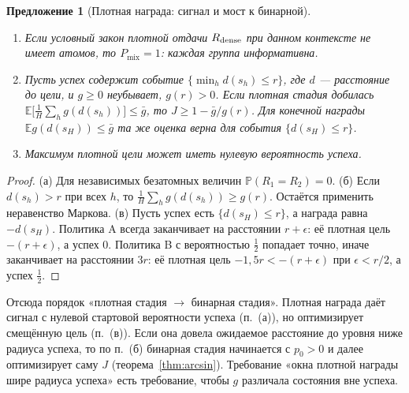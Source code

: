 \documentclass[11pt,a4paper]{article}
\theoremstyle{plain}
\newtheorem{proposition}[theorem]{Предложение}
\theoremstyle{definition}
\theoremstyle{remark}
\newcommand{\E}{\mathbb{E}}
\newcommand{\PP}{\mathbb{P}}
\newcommand{\Pmix}{P_{\mathrm{mix}}}
\begin{document}
\begin{proposition}[Плотная награда: сигнал и мост к бинарной]\label{prop:dense}
\begin{enumerate}[label=(\alph*)]
\item Если условный закон плотной отдачи $R_{\rm dense}$ при данном контексте не имеет атомов, то $\Pmix=1$: каждая группа информативна.
\item Пусть успех содержит событие $\{\min_hd(s_h)\le r\}$, где $d$ --- расстояние до цели, и $g\ge0$ неубывает, $g(r)>0$. Если плотная стадия добилась $\E\bigl[\tfrac1H\sum_hg(d(s_h))\bigr]\le\bar g$, то $J\ge1-\bar g/g(r)$. Для конечной награды $\E g(d(s_H))\le\bar g$ та же оценка верна для события $\{d(s_H)\le r\}$.
\item Максимум плотной цели может иметь нулевую вероятность успеха.
\end{enumerate}
\end{proposition}
\begin{proof}
(а) Для независимых безатомных величин $\PP(R_1=R_2)=0$.
(б) Если $d(s_h)>r$ при всех $h$, то $\tfrac1H\sum_hg(d(s_h))\ge g(r)$. Остаётся применить неравенство Маркова.
(в) Пусть успех есть $\{d(s_H)\le r\}$, а награда равна $-d(s_H)$. Политика A всегда заканчивает на расстоянии $r+\epsilon$: её плотная цель $-(r+\epsilon)$, а успех $0$. Политика B с вероятностью $\tfrac12$ попадает точно, иначе заканчивает на расстоянии $3r$: её плотная цель $-1{,}5r<-(r+\epsilon)$ при $\epsilon<r/2$, а успех $\tfrac12$.
\end{proof}

Отсюда порядок «плотная стадия $\to$ бинарная стадия». Плотная награда даёт сигнал с нулевой стартовой вероятности успеха (п.~(а)), но оптимизирует смещённую цель (п.~(в)). Если она довела ожидаемое расстояние до уровня ниже радиуса успеха, то по п.~(б) бинарная стадия начинается с $p_0>0$ и далее оптимизирует саму $J$ (теорема~\ref{thm:arcsin}). Требование «окна плотной награды шире радиуса успеха» есть требование, чтобы $g$ различала состояния вне успеха.
\end{document}
